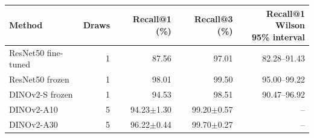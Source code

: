 \begin{tabular}{lrrrr}
\toprule
Method & Draws & Recall@1 (\%) & Recall@3 (\%) & \makecell{Recall@1 Wilson\\95\% interval} \\
\midrule
ResNet50 fine-tuned & 1 & 87.56 & 97.01 & 82.28--91.43 \\
ResNet50 frozen & 1 & 98.01 & 99.50 & 95.00--99.22 \\
DINOv2-S frozen & 1 & 94.53 & 98.51 & 90.47--96.92 \\
DINOv2-A10 & 5 & 94.23$\pm$1.30 & 99.20$\pm$0.57 & -- \\
DINOv2-A30 & 5 & 96.22$\pm$0.44 & 99.70$\pm$0.27 & -- \\
\bottomrule
\end{tabular}
